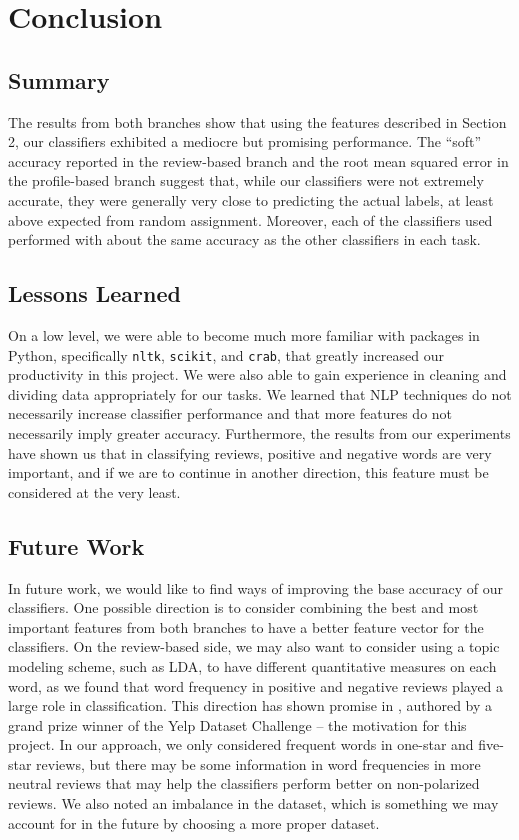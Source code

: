 \section{Conclusion}

\subsection{Summary}
The results from both branches show that using the features described in Section 2, our classifiers exhibited a mediocre but promising performance. The ``soft'' accuracy reported in the review-based branch and the root mean squared error in the profile-based branch suggest that, while our classifiers were not extremely accurate, they were generally very close to predicting the actual labels, at least above expected from random assignment. Moreover, each of the classifiers used performed with about the same accuracy as the other classifiers in each task. 

\subsection{Lessons Learned}
On a low level, we were able to become much more familiar with packages in Python, specifically \texttt{nltk}, \texttt{scikit}, and \texttt{crab}, that greatly increased our productivity in this project. We were also able to gain experience in cleaning and dividing data appropriately for our tasks. We learned that NLP techniques do not necessarily increase classifier performance and that more features do not necessarily imply greater accuracy. Furthermore, the results from our experiments have shown us that in classifying reviews, positive and negative words are very important, and if we are to continue in another direction, this feature must be considered at the very least.

\subsection{Future Work}
In future work, we would like to find ways of improving the base accuracy of our classifiers. One possible direction is to consider combining the best and most important features from both branches to have a better feature vector for the classifiers. On the review-based side, we may also want to consider using a topic modeling scheme, such as LDA, to have different quantitative measures on each word, as we found that word frequency in positive and negative reviews played a large role in classification. This direction has shown promise in \cite{lda}, authored by a grand prize winner of the Yelp Dataset Challenge -- the motivation for this project. In our approach, we only considered frequent words in one-star and five-star reviews, but there may be some information in word frequencies in more neutral reviews that may help the classifiers perform better on non-polarized reviews. We also noted an imbalance in the dataset, which is something we may account for in the future by choosing a more proper dataset.